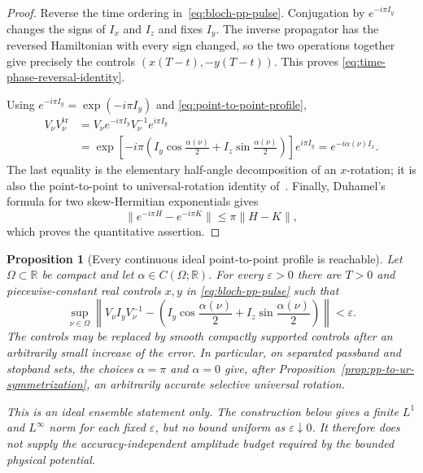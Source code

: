 \documentclass[11pt]{article}
\newtheorem{proposition}[theorem]{Proposition}
\theoremstyle{remark}
\begin{document}
\begin{proof}
Reverse the time ordering in~\eqref{eq:bloch-pp-pulse}.  Conjugation by
$e^{-i\pi I_y}$ changes the signs of $I_x$ and $I_z$ and fixes $I_y$.
The inverse propagator has the reversed Hamiltonian with every sign changed,
so the two operations together give precisely the controls
$(x(T-t),-y(T-t))$.  This proves
\eqref{eq:time-phase-reversal-identity}.

Using $e^{-i\pi I_y}=\exp(-i\pi I_y)$ and
\eqref{eq:point-to-point-profile},
\begin{align*}
 V_\nu V_\nu^{\mathrm{tr}}
 &=
 V_\nu e^{-i\pi I_y}V_\nu^{-1}e^{i\pi I_y}\\
 &=
 \exp\!\left[
  -i\pi\left(
   I_y\cos\frac{\alpha(\nu)}2
   +I_z\sin\frac{\alpha(\nu)}2
  \right)
 \right]e^{i\pi I_y}
 =e^{-i\alpha(\nu)I_x}.
\end{align*}
The last equality is the elementary half-angle decomposition of an
$x$-rotation; it is also the point-to-point to universal-rotation identity
of~\cite{LuyKobzarSkinnerKhanejaGlaser2005}.  Finally, Duhamel's formula for
two skew-Hermitian exponentials gives
\[
 \|e^{-i\pi H}-e^{-i\pi K}\|\leq\pi\|H-K\|,
\]
which proves the quantitative assertion.
\end{proof}

\begin{proposition}[Every continuous ideal point-to-point profile is reachable]
\label{prop:ideal-pp-profile-reachable}
Let $\Omega\subset\mathbb R$ be compact and let
$\alpha\in C(\Omega;\mathbb R)$.  For every $\varepsilon>0$ there are
$T>0$ and piecewise-constant real controls $x,y$ in
\eqref{eq:bloch-pp-pulse} such that
\begin{equation}
 \sup_{\nu\in\Omega}
 \left\|
  V_\nu I_yV_\nu^{-1}
  -
  \left(
   I_y\cos\frac{\alpha(\nu)}2
   +I_z\sin\frac{\alpha(\nu)}2
  \right)
 \right\|<\varepsilon .
 \label{eq:ideal-pp-profile-reachable}
\end{equation}
The controls may be replaced by smooth compactly supported controls after an
arbitrarily small increase of the error.  In particular, on separated
passband and stopband sets, the choices $\alpha=\pi$ and $\alpha=0$ give,
after Proposition~\ref{prop:pp-to-ur-symmetrization}, an arbitrarily accurate
selective universal rotation.

This is an ideal ensemble statement only.  The construction below gives a
finite $L^1$ and $L^\infty$ norm for each fixed $\varepsilon$, but no bound
uniform as $\varepsilon\downarrow0$.  It therefore does not supply the
accuracy-independent amplitude budget required by the bounded physical
potential.
\end{proposition}
\end{document}
